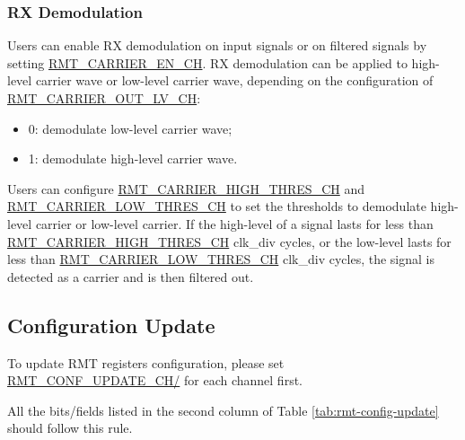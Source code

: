 \documentclass[main\_\_EN.tex]{subfiles}
\begin{document}
\subsubsection{RX Demodulation}

Users can enable RX demodulation on input signals or on filtered signals by setting \hyperref[fielddesc:RMTCARRIERENCHM]{RMT\_CARRIER\_EN\_CH}. RX demodulation can be applied to high-level carrier wave or low-level carrier wave, depending on the configuration of \hyperref[fielddesc:RMTCARRIEROUTLVCHM]{RMT\_CARRIER\_OUT\_LV\_CH}: 
\begin{itemize}
    \item 0: demodulate low-level carrier wave;
    \item 1: demodulate high-level carrier wave.
\end{itemize}

Users can configure \hyperref[fielddesc:RMTCARRIERHIGHTHRESCHM]{RMT\_CARRIER\_HIGH\_THRES\_CH} and \hyperref[fielddesc:RMTCARRIERLOWTHRESCHM]{RMT\_CARRIER\_LOW\_THRES\_CH} to set the thresholds to demodulate high-level carrier or low-level carrier. If the high-level of a signal lasts for less than \hyperref[fielddesc:RMTCARRIERHIGHTHRESCHM]{RMT\_CARRIER\_HIGH\_THRES\_CH} clk\_div cycles, or the low-level lasts for less than \hyperref[fielddesc:RMTCARRIERLOWTHRESCHM]{RMT\_CARRIER\_LOW\_THRES\_CH} clk\_div cycles, the signal is detected as a carrier and is then filtered out.


\subsection{Configuration Update}\label{conf_update}

To update RMT registers configuration, please set \hyperref[fielddesc:RMTCONFUPDATECHN]{RMT\_CONF\_UPDATE\_CH/} for each channel first.

All the bits/fields listed in the second column of Table \ref{tab:rmt-config-update} should follow this rule.
\end{document}
